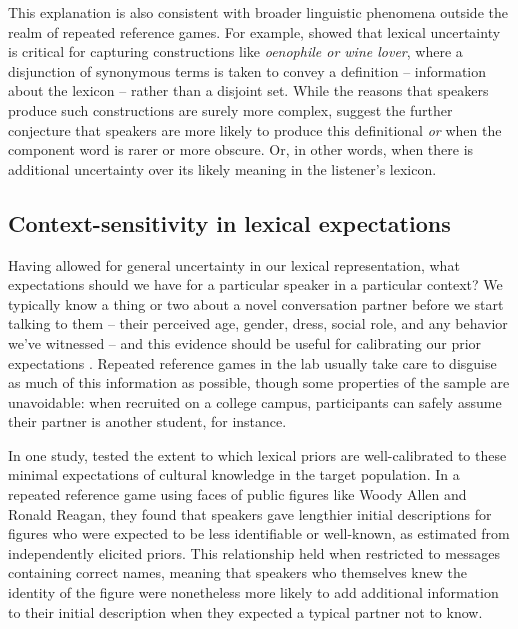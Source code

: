 \documentclass[11pt, floatsintext, jou]{apa6}
\begin{document}
This explanation is also consistent with broader linguistic phenomena outside the realm of repeated reference games. For example,  showed that lexical uncertainty is critical for capturing constructions like \emph{oenophile or wine lover}, where a disjunction of synonymous terms is taken to convey a definition -- information about the lexicon -- rather than a disjoint set. While the reasons that speakers produce such constructions are surely more complex,  suggest the further conjecture that speakers are more likely to produce this definitional \emph{or} when the component word is rarer or more obscure. Or, in other words, when there is additional uncertainty over its likely meaning in the listener's lexicon. 

\subsection{Context-sensitivity in lexical expectations}

Having allowed for general uncertainty in our lexical representation, what expectations should we have for a particular speaker in a particular context? We typically know a thing or two about a novel conversation partner before we start talking to them -- their perceived age, gender, dress, social role, and any behavior we've witnessed -- and this evidence should be useful for calibrating our prior expectations \cite{Davidson86_DerangementOfEpitaphs}. Repeated reference games in the lab usually take care to disguise as much of this information as possible, though some properties of the sample are unavoidable: when recruited on a college campus, participants can safely assume their partner is another student, for instance. 

In one study,  tested the extent to which lexical priors are well-calibrated to these minimal expectations of cultural knowledge in the target population. In a repeated reference game using faces of public figures like Woody Allen and Ronald Reagan, they found that speakers gave lengthier initial descriptions for figures who were expected to be less identifiable or well-known, as estimated from independently elicited priors. This relationship held when restricted to messages containing correct names, meaning that speakers who themselves knew the identity of the figure were nonetheless more likely to add additional information to their initial description when they expected a typical partner not to know.
\end{document}
